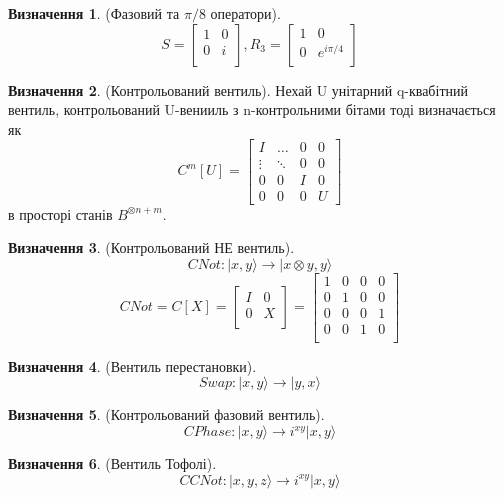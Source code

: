 \documentclass{article}
\theoremstyle{definition}
\newtheorem{definition}{Визначення}
\begin{document}
\begin{definition} (Фазовий та $\pi/8$ оператори).
$$
S=
\begin{bmatrix}
1 & 0 \\
0 & i \\
\end{bmatrix},
R_3=
\begin{bmatrix}
1 & 0 \\
0 & e^{i\pi/4} \\
\end{bmatrix}
$$
\end{definition}

\begin{definition} (Контрольований вентиль).
Нехай U унітарний q-квабітний вентиль, контрольований U-венииль з n-контрольними бітами
тоді визначається як
$$
C^m[U] =
\begin{bmatrix}
I & \dots & 0 & 0 \\
\vdots & \ddots & 0 & 0 \\
0 & 0 & I & 0 \\
0 & 0 & 0 & U
\end{bmatrix}
$$
в просторі станів $B^{\otimes n+m}$.
\end{definition}

\begin{definition} (Контрольований НЕ вентиль).
$$
CNot : |x,y\rangle \rightarrow |x\otimes y,y\rangle
$$
$$
CNot=C[X]=
\begin{bmatrix}
I & 0 \\
0 & X \\
\end{bmatrix}
=
\begin{bmatrix}
1 & 0 & 0 & 0 \\
0 & 1 & 0 & 0 \\
0 & 0 & 0 & 1 \\
0 & 0 & 1 & 0 \\
\end{bmatrix}
$$
\end{definition}

\begin{definition} (Вентиль перестановки).
$$
Swap : |x,y\rangle \rightarrow |y,x\rangle
$$
\end{definition}

\begin{definition} (Контрольований фазовий вентиль).
$$
CPhase : |x,y\rangle \rightarrow i^{xy}|x,y\rangle
$$
\end{definition}

\begin{definition} (Вентиль Тофолі).
$$
CCNot : |x,y,z\rangle \rightarrow i^{xy}|x,y\rangle
$$
\end{definition}
\end{document}
